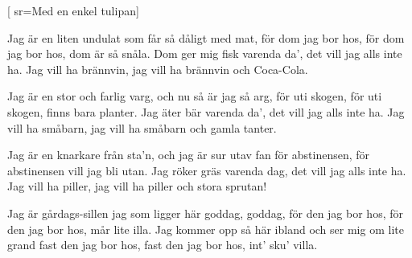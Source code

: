 


[
	sr={Med en enkel tulipan}]		%
	
\beginverse*		%
Jag är en liten undulat
som får så dåligt med mat,
för dom jag bor hos,
för dom jag bor hos, dom är så snåla.
Dom ger mig fisk varenda da',
det vill jag alls inte ha.
Jag vill ha brännvin,
jag vill ha brännvin och Coca-Cola.
\endverse			%

\beginverse*		%
Jag är en stor och farlig varg,
och nu så är jag så arg,
för uti skogen,
för uti skogen, finns bara planter.
Jag äter bär varenda da',
det vill jag alls inte ha.
Jag vill ha småbarn,
jag vill ha småbarn och gamla tanter.
\endverse			%

\beginverse*		%
Jag är en knarkare från sta'n,
och jag är sur utav fan
för abstinensen, för abstinensen vill jag bli utan.
Jag röker gräs varenda dag,
det vill jag alls inte ha.
Jag vill ha piller, 
jag vill ha piller
och stora sprutan!
\endverse			%

\beginverse*		%
Jag är gårdags-sillen jag
som ligger här goddag, goddag,
för den jag bor hos,
för den jag bor hos, mår lite illa.
Jag kommer opp så här ibland
och ser mig om lite grand
fast den jag bor hos,
fast den jag bor hos, int' sku' villa.
\endverse			%
\endsong			%
